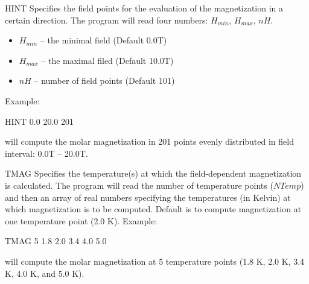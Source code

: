 \begin{keywordlist}
\item[HINT]
Specifies the field points for the evaluation of the magnetization in a certain direction. The program will read four numbers: $H_{min}$, $H_{max}$, $nH$.
\begin{itemize}
 \item $H_{min}$ -- the minimal field (Default 0.0T)
 \item $H_{max}$ -- the maximal filed (Default 10.0T)
 \item $nH$    -- number of field points (Default 101)
\end{itemize}
Example:
\begin{inputlisting}
HINT
0.0  20.0  201
\end{inputlisting}
 will compute the molar magnetization in 201 points evenly distributed in field interval: 0.0T -- 20.0T.




\item[TMAG]
Specifies the temperature(s) at which the field-dependent magnetization is calculated. The program will read the number of temperature points ($NTemp$) and then an array of real numbers specifying the temperatures (in Kelvin) at which magnetization is to be computed.
Default is to compute magnetization at one temperature point (2.0 K).
Example:
\begin{inputlisting}
TMAG
5   1.8  2.0  3.4  4.0  5.0
\end{inputlisting}
 will compute the molar magnetization at 5 temperature points (1.8 K, 2.0 K, 3.4 K, 4.0 K, and 5.0 K).





\end{keywordlist}
